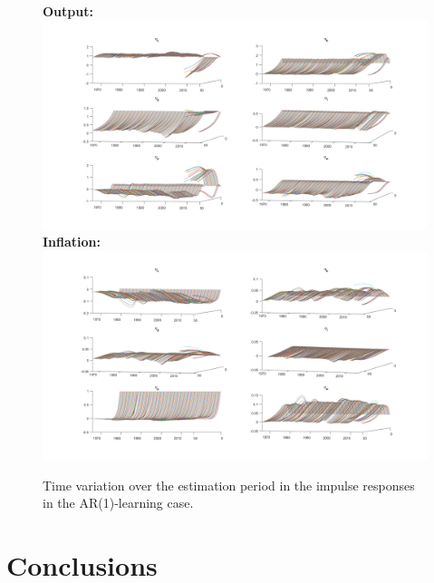 \documentclass[12pt,reqno]{article}
\numberwithin{equation}{section}
\begin{document}
\begin{figure}[H]
\caption{Time variation over the estimation period in the impulse responses in the AR(1)-learning case. } 
\label{irf_ar1_2_3d}
\textbf{Output:}\\
\includegraphics[scale=0.5]{AR1_impresp_output_3d.pdf}
\textbf{Inflation:}\\
\includegraphics[scale=0.5]{AR1_impresp_pinf_3d.pdf}

\end{figure}






\section{Conclusions} 
\end{document}
